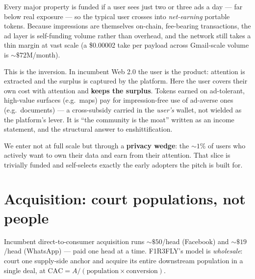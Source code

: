 \documentclass[11pt]{article}
\begin{document}
\begin{center}
\end{center}

Every major property is funded if a user sees just two or three ads a day --- far below real exposure --- so the typical user crosses into \emph{net-earning} portable tokens. Because impressions are themselves on-chain, fee-bearing transactions, the ad layer is self-funding volume rather than overhead, and the network still takes a thin margin at vast scale (a \$0.00002 take per payload across Gmail-scale volume is ${\sim}\$72$M/month).

This is the inversion. In incumbent Web 2.0 the user is the product: attention is extracted and the surplus is captured by the platform. Here the user covers their own cost with attention and \textbf{keeps the surplus}. Tokens earned on ad-tolerant, high-value surfaces (e.g.\ maps) pay for impression-free use of ad-averse ones (e.g.\ documents) --- a cross-subsidy carried in the \emph{user's} wallet, not wielded as the platform's lever. It is ``the community is the moat'' written as an income statement, and the structural answer to enshittification.

We enter not at full scale but through a \textbf{privacy wedge}: the ${\sim}1\%$ of users who actively want to own their data and earn from their attention. That slice is trivially funded and self-selects exactly the early adopters the pitch is built for.

\section{Acquisition: court populations, not people}

Incumbent direct-to-consumer acquisition runs ${\sim}\$50$/head (Facebook) and ${\sim}\$19$/head (WhatsApp) --- paid one head at a time. F1R3FLY's model is \emph{wholesale}: court one supply-side anchor and acquire its entire downstream population in a single deal, at $\mathrm{CAC} = A / (\text{population} \times \text{conversion})$.
\end{document}
